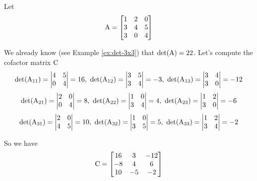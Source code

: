 \begin{example}
    Let
    $$
        \mathrm{A} = \left[\begin{matrix}
        1 & 2 & 0 \\
        3 & 4 & 5 \\
        3 & 0 & 4
        \end{matrix}\right]
    $$
    
    We already know (see Example \ref{ex:det-3x3}) that $\mathrm{det}{(\mathrm{A})} = 22$. Let's compute the cofactor matrix $\mathrm{C}$
    $$
        \det{(\mat{A}_{11})} = \left\vert\begin{matrix}4 & 5 \\ 0 & 4\end{matrix}\right\vert = 16,\ 
        \det{(\mat{A}_{12})} = \left\vert\begin{matrix}3 & 5 \\ 3 & 4\end{matrix}\right\vert = -3,\ 
        \det{(\mat{A}_{13})} = \left\vert\begin{matrix}3 & 4 \\ 3 & 0\end{matrix}\right\vert = -12
    $$
    $$
        \det{(\mat{A}_{21})} = \left\vert\begin{matrix}2 & 0 \\ 0 & 4\end{matrix}\right\vert = 8,\ 
        \det{(\mat{A}_{22})} = \left\vert\begin{matrix}1 & 0 \\ 3 & 4\end{matrix}\right\vert = 4,\ 
        \det{(\mat{A}_{23})} = \left\vert\begin{matrix}1 & 2 \\ 3 & 0\end{matrix}\right\vert = -6
    $$
    $$
        \det{(\mat{A}_{31})} = \left\vert\begin{matrix}2 & 0 \\ 4 & 5\end{matrix}\right\vert = 10,\ 
        \det{(\mat{A}_{32})} = \left\vert\begin{matrix}1 & 0 \\ 3 & 5\end{matrix}\right\vert = 5,\ 
        \det{(\mat{A}_{33})} = \left\vert\begin{matrix}1 & 2 \\ 3 & 4\end{matrix}\right\vert = -2
    $$
    
    So we have
    \renewcommand*{\arraystretch}{1.5}
    $$
        \mathrm{C} = \left[\begin{matrix}
        16 & 3 & -12 \\
        -8 & 4 & 6 \\
        10 & -5 & -2
        \end{matrix}\right]
    $$
    

\end{example}
